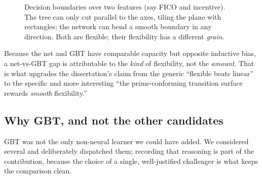\documentclass[11pt]{article}
\begin{document}
\begin{figure}[H]
\centering
{}
\caption{Decision boundaries over two features (say FICO and incentive). The tree can only cut
parallel to the axes, tiling the plane with rectangles; the network can bend a smooth boundary
in any direction. Both are flexible; their flexibility has a different \emph{grain}.}
\end{figure}

\begin{keyidea}
Because the net and GBT have comparable capacity but opposite inductive bias, a net-vs-GBT gap
is attributable to the \emph{kind} of flexibility, not the \emph{amount}. That is what upgrades
the dissertation's claim from the generic ``flexible beats linear'' to the specific and more
interesting ``the prime-conforming transition surface rewards \emph{smooth} flexibility.''
\end{keyidea}

\subsection{Why GBT, and not the other candidates}

GBT was not the only non-neural learner we could have added. We considered several and
deliberately dispatched them; recording that reasoning is part of the contribution, because the
choice of a single, well-justified challenger is what keeps the comparison clean.
\end{document}
